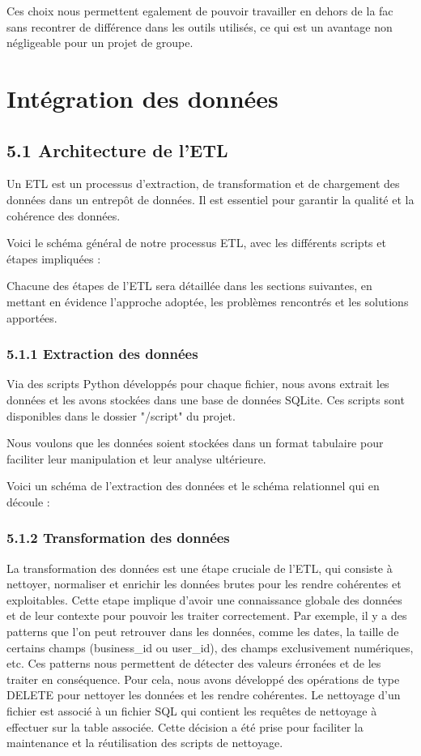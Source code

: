 Ces choix nous permettent egalement de pouvoir travailler en dehors de la fac sans recontrer de différence dans les outils utilisés, ce qui est un avantage non négligeable pour un projet de groupe.

\chapter*{Intégration des données}


\section*{5.1 Architecture de l’ETL}

Un ETL est un processus d’extraction, de transformation et de chargement des données dans un entrepôt de données. Il est essentiel pour garantir la qualité et la cohérence des données.

Voici le schéma général de notre processus ETL, avec les différents scripts et étapes impliquées :


Chacune des étapes de l’ETL sera détaillée dans les sections suivantes, en mettant en évidence l'approche adoptée, les problèmes rencontrés et les solutions apportées.

\subsection{5.1.1 Extraction des données}

Via des scripts Python développés pour chaque fichier, nous avons extrait les données et les avons stockées dans une base de données SQLite.
Ces scripts sont disponibles dans le dossier "/script" du projet.

Nous voulons que les données soient stockées dans un format tabulaire pour faciliter leur manipulation et leur analyse ultérieure.

Voici un schéma de l'extraction des données et le schéma relationnel qui en découle :

\subsection{5.1.2 Transformation des données}

La transformation des données est une étape cruciale de l’ETL, qui consiste à nettoyer, normaliser et enrichir les données brutes pour les rendre cohérentes et exploitables.
Cette etape implique d'avoir une connaissance globale des données et de leur contexte pour pouvoir les traiter correctement.
Par exemple, il y a des patterns que l'on peut retrouver dans les données, comme les dates, la taille de certains champs (business_id ou user_id), des champs exclusivement numériques, etc.
Ces patterns nous permettent de détecter des valeurs érronées et de les traiter en conséquence.
Pour cela, nous avons développé des opérations de type DELETE pour nettoyer les données et les rendre cohérentes.
Le nettoyage d'un fichier est associé à un fichier SQL qui contient les requêtes de nettoyage à effectuer sur la table associée.
Cette décision a été prise pour faciliter la maintenance et la réutilisation des scripts de nettoyage.

